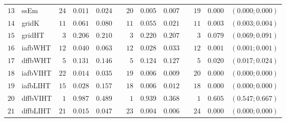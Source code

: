 \begin{table*}[!htbp]
\begin{tabular}{@{}rlrrrrrrrrrcc@{}}
\footnotesize{$13$} & \footnotesize{ssEm     } & \footnotesize{$24$} & \footnotesize{$0.011$} & \footnotesize{$0.024$} && \footnotesize{$20$} & \footnotesize{$0.005$} & \footnotesize{$0.007$} && \footnotesize{$19$} & \footnotesize{$0.000$} & \footnotesize{$(0.000;0.000)$} \\
\footnotesize{$14$} & \footnotesize{gridK    } & \footnotesize{$11$} & \footnotesize{$0.061$} & \footnotesize{$0.080$} && \footnotesize{$11$} & \footnotesize{$0.055$} & \footnotesize{$0.021$} && \footnotesize{$11$} & \footnotesize{$0.003$} & \footnotesize{$(0.003;0.004)$} \\
\footnotesize{$15$} & \footnotesize{gridHT   } & \footnotesize{$3 $} & \footnotesize{$0.206$} & \footnotesize{$0.210$} && \footnotesize{$3 $} & \footnotesize{$0.220$} & \footnotesize{$0.207$} && \footnotesize{$3 $} & \footnotesize{$0.079$} & \footnotesize{$(0.069;0.091)$} \\
\footnotesize{$16$} & \footnotesize{iafbWHT  } & \footnotesize{$12$} & \footnotesize{$0.040$} & \footnotesize{$0.063$} && \footnotesize{$12$} & \footnotesize{$0.028$} & \footnotesize{$0.033$} && \footnotesize{$12$} & \footnotesize{$0.001$} & \footnotesize{$(0.001;0.001)$} \\
\footnotesize{$17$} & \footnotesize{dffbWHT  } & \footnotesize{$5 $} & \footnotesize{$0.131$} & \footnotesize{$0.146$} && \footnotesize{$5 $} & \footnotesize{$0.124$} & \footnotesize{$0.127$} && \footnotesize{$5 $} & \footnotesize{$0.020$} & \footnotesize{$(0.017;0.024)$} \\
\footnotesize{$18$} & \footnotesize{iafbVIHT } & \footnotesize{$22$} & \footnotesize{$0.014$} & \footnotesize{$0.035$} && \footnotesize{$19$} & \footnotesize{$0.006$} & \footnotesize{$0.009$} && \footnotesize{$20$} & \footnotesize{$0.000$} & \footnotesize{$(0.000;0.000)$} \\
\footnotesize{$19$} & \footnotesize{iafbLIHT } & \footnotesize{$15$} & \footnotesize{$0.028$} & \footnotesize{$0.157$} && \footnotesize{$18$} & \footnotesize{$0.006$} & \footnotesize{$0.012$} && \footnotesize{$18$} & \footnotesize{$0.000$} & \footnotesize{$(0.000;0.000)$} \\
\footnotesize{$20$} & \footnotesize{dffbVIHT } & \footnotesize{$1 $} & \footnotesize{$0.987$} & \footnotesize{$0.489$} && \footnotesize{$1 $} & \footnotesize{$0.939$} & \footnotesize{$0.368$} && \footnotesize{$1 $} & \footnotesize{$0.605$} & \footnotesize{$(0.547;0.667)$} \\
\footnotesize{$21$} & \footnotesize{dffbLIHT } & \footnotesize{$21$} & \footnotesize{$0.015$} & \footnotesize{$0.047$} && \footnotesize{$23$} & \footnotesize{$0.004$} & \footnotesize{$0.006$} && \footnotesize{$24$} & \footnotesize{$0.000$} & \footnotesize{$(0.000;0.000)$} \\

\end{tabular}
\end{table*}
